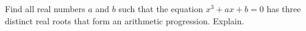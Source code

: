 Find all real numbers $a$ and $b$ such that the equation $x^3+ax+b=0$ has three distinct real roots that form an arithmetic progression. Explain.
